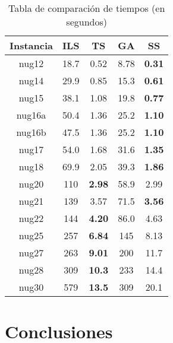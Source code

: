 \documentclass{ci5652}
\begin{document}
\begin{table}[ht]
\centering
\caption{Tabla de comparación de tiempos (en segundos)}
\label{table:time}
\begin{tabular}{|c|c|c|c|c|}
\hline
{\bf Instancia} & {\bf ILS} & {\bf TS}   & {\bf GA} & {\bf SS}   \\ \hline
nug12           & 18.7      & 0.52       & 8.78     & {\bf 0.31} \\ \hline
nug14           & 29.9      & 0.85       & 15.3     & {\bf 0.61} \\ \hline
nug15           & 38.1      & 1.08       & 19.8     & {\bf 0.77} \\ \hline
nug16a          & 50.4      & 1.36       & 25.2     & {\bf 1.10} \\ \hline
nug16b          & 47.5      & 1.36       & 25.2     & {\bf 1.10} \\ \hline
nug17           & 54.0      & 1.68       & 31.6     & {\bf 1.35} \\ \hline
nug18           & 69.9      & 2.05       & 39.3     & {\bf 1.86} \\ \hline
nug20           & 110       & {\bf 2.98} & 58.9     & 2.99       \\ \hline
nug21           & 139       & 3.57       & 71.5     & {\bf 3.56} \\ \hline
nug22           & 144       & {\bf 4.20} & 86.0     & 4.63       \\ \hline
nug25           & 257       & {\bf 6.84} & 145      & 8.13       \\ \hline
nug27           & 263       & {\bf 9.01} & 200      & 11.7       \\ \hline
nug28           & 309       & {\bf 10.3} & 233      & 14.4       \\ \hline
nug30           & 579       & {\bf 13.5} & 309      & 20.1       \\ \hline
\end{tabular}
\end{table}

\newpage

\section*{Conclusiones}
\end{document}

